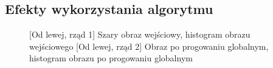 \documentclass[a4paper,12pt, titlepage]{report}
\begin{document}
\subsection*{Efekty wykorzystania algorytmu}
\begin{figure}[h]
    \centering
    \qquad
    \caption{[Od lewej, rząd 1] Szary obraz wejściowy, histogram obrazu wejściowego [Od lewej, rząd 2] Obraz po progowaniu globalnym, histogram obrazu po progowaniu globalnym}%
    \label{fig:geo_after_grey1}%
\end{figure}
\end{document}
